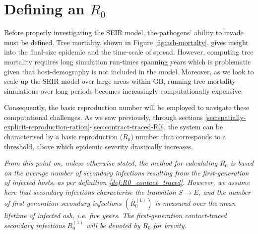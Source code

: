 \section{Defining an $R_0$}
\label{sec:SEIR-R0-definition}

Before properly investigating the SEIR model, the pathogens' ability to invade must be defined. 
Tree mortality, shown in Figure \ref{fig:ash-mortalty}, gives insight into the final-size epidemic and the time-scale of spread.
However, computing tree mortality requires long simulation run-times spanning years which is problematic given that host-demography is not included in the model.
Moreover, as we look to scale up the SEIR model over large areas within GB, running tree mortality simulations over long periods
becomes increasingly computationally expensive. 

Consequently, the basic reproduction number will be employed to navigate these computational challenges. 
As we saw previously, through sections \ref{sec:spatially-explicit-reproduction-ration}-\ref{sec:contract-traced-R0}, 
the system can be characterised by a basic reproduction ($R_0$) number that corresponds to a threshold, above which epidemic severity drastically increases.

\textit{From this point on, unless otherwise stated, the method for calculating $R_0$ is based on the average number of secondary infections
resulting from the first-generation of infected hosts, as per definition \ref{def:R0_contact_traced}. However, we assume here that secondary infections
characterise the transition $S\rightarrow E$, and the number of first-generation secondary infections $(R_0^{(1)})$ is measured over the mean lifetime
of infected ash, i.e. five years. The first-generation contact-traced secondary infections $R_0^{(1)}$ will be denoted by $R_0$ for brevity.}


